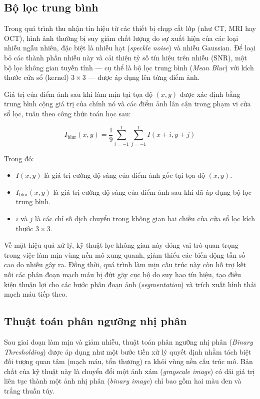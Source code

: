 \subsection{Bộ lọc trung bình}

Trong quá trình thu nhận tín hiệu từ các thiết bị chụp cắt lớp (như CT, MRI hay OCT), hình ảnh thường bị suy giảm chất lượng do sự xuất hiện của các loại nhiễu ngẫu nhiên, đặc biệt là nhiễu hạt (\textit{speckle noise}) và nhiễu Gaussian. Để loại bỏ các thành phần nhiễu này và cải thiện tỷ số tín hiệu trên nhiễu (SNR), một bộ lọc không gian tuyến tính — cụ thể là bộ lọc trung bình (\textit{Mean Blur}) với kích thước cửa sổ (kernel) $3 \times 3$ — được áp dụng lên từng điểm ảnh.

Giá trị của điểm ảnh sau khi làm mịn tại tọa độ $(x, y)$ được xác định bằng trung bình cộng giá trị của chính nó và các điểm ảnh lân cận trong phạm vi cửa sổ lọc, tuân theo công thức toán học sau:

\begin{equation}
I_{\text{blur}}(x, y) = \frac{1}{9} \sum_{i=-1}^{1} \sum_{j=-1}^{1} I(x + i, y + j)
\label{eq:mean_filter}
\end{equation}

Trong đó:
\begin{itemize}
    \item $I(x, y)$ là giá trị cường độ sáng của điểm ảnh gốc tại tọa độ $(x, y)$.
    \item $I_{\text{blur}}(x, y)$ là giá trị cường độ sáng của điểm ảnh sau khi đã áp dụng bộ lọc trung bình.
    \item $i$ và $j$ là các chỉ số dịch chuyển trong không gian hai chiều của cửa sổ lọc kích thước $3 \times 3$.
\end{itemize}

Về mặt hiệu quả xử lý, kỹ thuật lọc không gian này đóng vai trò quan trọng trong việc làm mịn vùng nền mô xung quanh, giảm thiểu các biến động tần số cao do nhiễu gây ra. Đồng thời, quá trình làm mịn cấu trúc này còn hỗ trợ kết nối các phân đoạn mạch máu bị đứt gãy cục bộ do suy hao tín hiệu, tạo điều kiện thuận lợi cho các bước phân đoạn ảnh (\textit{segmentation}) và trích xuất hình thái mạch máu tiếp theo.

\subsection{Thuật toán phân ngưỡng nhị phân}

Sau giai đoạn làm mịn và giảm nhiễu, thuật toán phân ngưỡng nhị phân (\textit{Binary Thresholding}) được áp dụng như một bước tiền xử lý quyết định nhằm tách biệt đối tượng quan tâm (mạch máu, tổn thương) ra khỏi vùng nền cấu trúc mô. Bản chất của kỹ thuật này là chuyển đổi một ảnh xám (\textit{grayscale image}) có dải giá trị liên tục thành một ảnh nhị phân (\textit{binary image}) chỉ bao gồm hai màu đen và trắng thuần túy.

